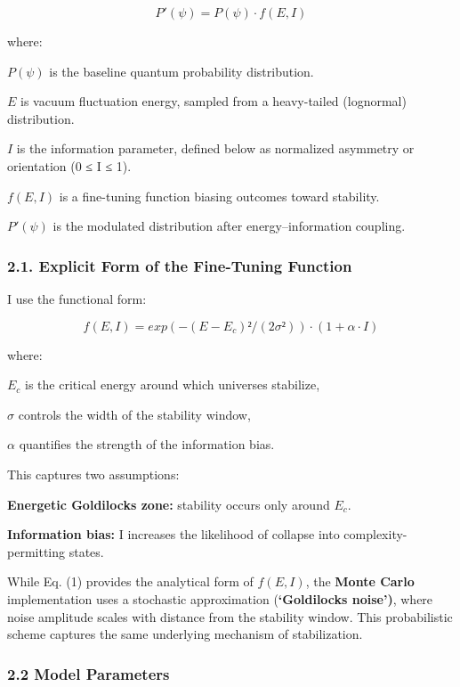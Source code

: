 \[
P′(ψ)=P(ψ)⋅f(E,I)
\]

where:

\(P(ψ)\) is the baseline quantum probability distribution.

\(E\) is vacuum fluctuation energy, sampled from a heavy-tailed
(lognormal) distribution.

\(I\) is the information parameter, defined below as normalized
asymmetry or orientation (0 ≤ I ≤ 1).

\(f(E, I)\) is a fine-tuning function biasing outcomes toward stability.

\(P′(ψ)\) is the modulated distribution after energy--information
coupling.

\subsubsection{\texorpdfstring{\textbf{2.1. Explicit Form of the
Fine-Tuning
Function}}{2.1. Explicit Form of the Fine-Tuning Function}}\label{explicit-form-of-the-fine-tuning-function}

I use the functional form:

\[
f(E, I) = exp(−(E − E_c)² / (2σ²)) · (1 + α · I)
\]

where:

\(E_c\) is the critical energy around which universes stabilize,

\(σ\) controls the width of the stability window,

\(α\) quantifies the strength of the information bias.

This captures two assumptions:

\textbf{Energetic Goldilocks zone:} stability occurs only around
\(E_c\).

\textbf{Information bias:} I increases the likelihood of collapse into
complexity-permitting states.

While Eq. (1) provides the analytical form of \(f(E, I)\), the
\textbf{Monte Carlo} implementation uses a stochastic approximation
(\textbf{`Goldilocks noise')}, where noise amplitude scales with
distance from the stability window. This probabilistic scheme captures
the same underlying mechanism of stabilization.

\subsubsection{\texorpdfstring{\textbf{2.2 Model
Parameters}}{2.2 Model Parameters}}\label{model-parameters}

